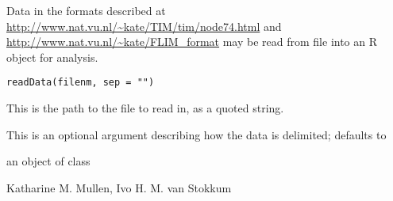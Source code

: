 \documentclass{article}
\begin{document}
\begin{Description}\relax
Data in the formats described at 
\url{http://www.nat.vu.nl/~kate/TIM/tim/node74.html} and 
\url{http://www.nat.vu.nl/~kate/FLIM_format}
may be read from file into an R object for analysis.
\end{Description}
\begin{Usage}
\begin{verbatim}
readData(filenm, sep = "")
\end{verbatim}
\end{Usage}
\begin{Arguments}
\begin{ldescription}
\item[\code{filenm}] This is the path to the file to read in, as a quoted
string. 
\item[\code{sep}] This is an optional argument describing how the data is 
delimited; defaults to 
\end{ldescription}
\end{Arguments}
\begin{Value}
an object of class 
\end{Value}
\begin{Author}\relax
Katharine M. Mullen, Ivo H. M. van Stokkum
\end{Author}
\begin{SeeAlso}\relax
{}
\end{SeeAlso}
\end{document}

